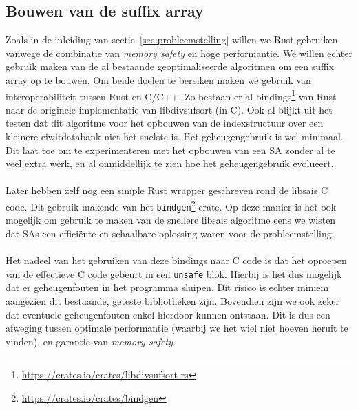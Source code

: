 \subsection{Bouwen van de suffix array}\label{subsec:bouwen-van-de-suffix-array}
Zoals in de inleiding van sectie~\ref{sec:probleemstelling} willen we Rust gebruiken vanwege de combinatie van \textit{memory safety} en hoge performantie.
We willen echter gebruik maken van de al bestaande geoptimaliseerde algoritmen om een suffix array op te bouwen.
Om beide doelen te bereiken maken we gebruik van interoperabiliteit tussen Rust en C/C++.
Zo bestaan er al bindings\footnote{\url{https://crates.io/crates/libdivsufsort-rs}} van Rust naar de originele implementatie van libdivsufsort\cite{libdivsufsort} (in C).
Ook al blijkt uit het testen dat dit algoritme voor het opbouwen van de indexstructuur over een kleinere eiwitdatabank niet het snelste is.
Het geheugengebruik is wel minimaal.
Dit laat toe om te experimenteren met het opbouwen van een SA zonder al te veel extra werk, en al onmiddellijk te zien hoe het geheugengebruik evolueert.
\\ \\
Later hebben zelf nog een simple Rust wrapper geschreven rond de libsais C code.
Dit gebruik makende van het \texttt{bindgen}\footnote{\url{https://crates.io/crates/bindgen}} crate.
Op deze manier is het ook mogelijk om gebruik te maken van de snellere libsais algoritme eens we wisten dat SAs een efficiënte en schaalbare oplossing waren voor de probleemstelling.
\\ \\
Het nadeel van het gebruiken van deze bindings naar C code is dat het oproepen van de effectieve C code gebeurt in een \texttt{unsafe} blok.
Hierbij is het dus mogelijk dat er geheugenfouten in het programma sluipen.
Dit risico is echter miniem aangezien dit bestaande, geteste bibliotheken zijn.
Bovendien zijn we ook zeker dat eventuele geheugenfouten enkel hierdoor kunnen ontstaan.
Dit is dus een afweging tussen optimale performantie (waarbij we het wiel niet hoeven heruit te vinden), en garantie van \textit{memory safety}.

